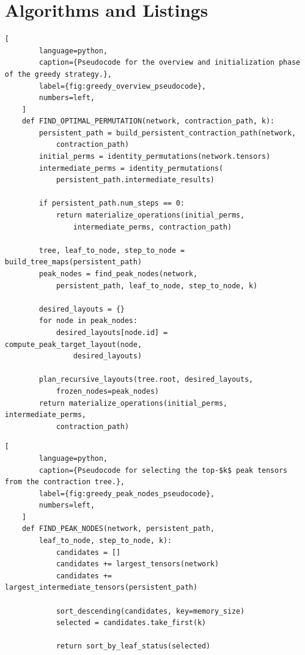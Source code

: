
\chapter{Algorithms and Listings}

\begin{center}
    \begin{lstlisting}[
        language=python,
        caption={Pseudocode for the overview and initialization phase of the greedy strategy.},
        label={fig:greedy_overview_pseudocode},
        numbers=left,
    ]
    def FIND_OPTIMAL_PERMUTATION(network, contraction_path, k):
        persistent_path = build_persistent_contraction_path(network, 
            contraction_path)
        initial_perms = identity_permutations(network.tensors)
        intermediate_perms = identity_permutations(
            persistent_path.intermediate_results)

        if persistent_path.num_steps == 0:
            return materialize_operations(initial_perms, 
                intermediate_perms, contraction_path)

        tree, leaf_to_node, step_to_node = build_tree_maps(persistent_path)
        peak_nodes = find_peak_nodes(network, 
            persistent_path, leaf_to_node, step_to_node, k)

        desired_layouts = {}
        for node in peak_nodes:
            desired_layouts[node.id] = compute_peak_target_layout(node, 
                desired_layouts)

        plan_recursive_layouts(tree.root, desired_layouts, 
            frozen_nodes=peak_nodes)
        return materialize_operations(initial_perms, intermediate_perms, 
            contraction_path)
    \end{lstlisting}
\end{center}

\newpage

\begin{center}
    \begin{lstlisting}[
        language=python,    
        caption={Pseudocode for selecting the top-$k$ peak tensors from the contraction tree.},
        label={fig:greedy_peak_nodes_pseudocode},
        numbers=left,
    ]
    def FIND_PEAK_NODES(network, persistent_path, 
        leaf_to_node, step_to_node, k):
            candidates = []
            candidates += largest_tensors(network)
            candidates += largest_intermediate_tensors(persistent_path)

            sort_descending(candidates, key=memory_size)
            selected = candidates.take_first(k)

            return sort_by_leaf_status(selected)
    \end{lstlisting}
\end{center}

